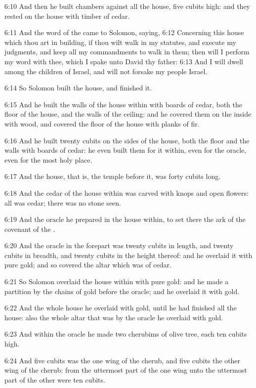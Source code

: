 6:10 And then he built chambers against all the house, five cubits high: and they rested on the house with timber of cedar.

6:11 And the word of the \LORD came to Solomon, saying, 6:12 Concerning this house which thou art in building, if thou wilt walk in my statutes, and execute my judgments, and keep all my commandments to walk in them; then will I perform my word with thee, which I spake unto David thy father: 6:13 And I will dwell among the children of Israel, and will not forsake my people Israel.

6:14 So Solomon built the house, and finished it.

6:15 And he built the walls of the house within with boards of cedar, both the floor of the house, and the walls of the ceiling: and he covered them on the inside with wood, and covered the floor of the house with planks of fir.

6:16 And he built twenty cubits on the sides of the house, both the floor and the walls with boards of cedar: he even built them for it within, even for the oracle, even for the most holy place.

6:17 And the house, that is, the temple before it, was forty cubits long.

6:18 And the cedar of the house within was carved with knops and open flowers: all was cedar; there was no stone seen.

6:19 And the oracle he prepared in the house within, to set there the ark of the covenant of the \LORD.

6:20 And the oracle in the forepart was twenty cubits in length, and twenty cubits in breadth, and twenty cubits in the height thereof: and he overlaid it with pure gold; and so covered the altar which was of cedar.

6:21 So Solomon overlaid the house within with pure gold: and he made a partition by the chains of gold before the oracle; and he overlaid it with gold.

6:22 And the whole house he overlaid with gold, until he had finished all the house: also the whole altar that was by the oracle he overlaid with gold.

6:23 And within the oracle he made two cherubims of olive tree, each ten cubits high.

6:24 And five cubits was the one wing of the cherub, and five cubits the other wing of the cherub: from the uttermost part of the one wing unto the uttermost part of the other were ten cubits.

